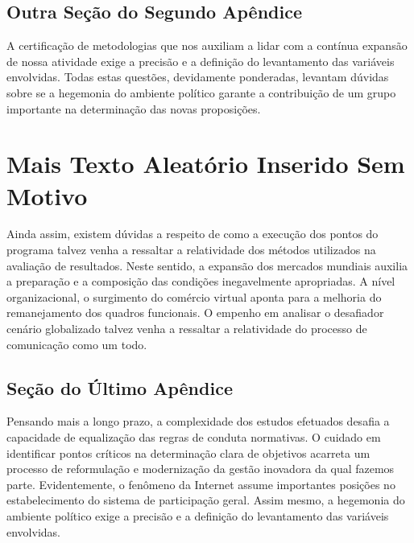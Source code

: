 \documentclass[fleqn]{profmat-cefet}
\begin{document}
\section{Outra Seção do Segundo Apêndice}
\label{sec:outra_secao_do_segundo_apendice}

A certificação de metodologias que nos auxiliam a lidar com a contínua expansão
de nossa atividade exige a precisão e a definição do levantamento das variáveis
envolvidas. Todas estas questões, devidamente ponderadas, levantam dúvidas sobre
se a hegemonia do ambiente político garante a contribuição de um grupo
importante na determinação das novas proposições. 

\chapter{Mais Texto Aleatório Inserido Sem Motivo}
\label{cap:ultimo_apendice}

Ainda assim, existem dúvidas a respeito de como a execução dos pontos do
programa talvez venha a ressaltar a relatividade dos métodos utilizados na
avaliação de resultados. Neste sentido, a expansão dos mercados mundiais auxilia
a preparação e a composição das condições inegavelmente apropriadas. A nível
organizacional, o surgimento do comércio virtual aponta para a melhoria do
remanejamento dos quadros funcionais. O empenho em analisar o desafiador cenário
globalizado talvez venha a ressaltar a relatividade do processo de comunicação
como um todo. 

\section{Seção do Último Apêndice}
\label{sec:secao_do_ultimo_apendice}

Pensando mais a longo prazo, a complexidade dos estudos efetuados desafia a
capacidade de equalização das regras de conduta normativas. O cuidado em
identificar pontos críticos na determinação clara de objetivos acarreta um
processo de reformulação e modernização da gestão inovadora da qual fazemos
parte. Evidentemente, o fenômeno da Internet assume importantes posições no
estabelecimento do sistema de participação geral. Assim mesmo, a hegemonia do
ambiente político exige a precisão e a definição do levantamento das variáveis
envolvidas. 
\end{document}
